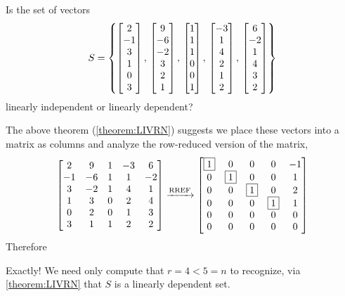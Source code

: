 \documentclass{ximera}
\begin{document}
\begin{example}%
  Is the set of vectors
  \[
    S=\left\{
      \begin{bmatrix}2\\-1\\3\\1\\0\\3\end{bmatrix},\,
      \begin{bmatrix}9\\-6\\-2\\3\\2\\1\end{bmatrix},\,
      \begin{bmatrix}1\\1\\1\\0\\0\\1\end{bmatrix},\,
      \begin{bmatrix}-3\\1\\4\\2\\1\\2\end{bmatrix},\,
      \begin{bmatrix}6\\-2\\1\\4\\3\\2\end{bmatrix}
    \right\}
  \]
  linearly independent or linearly dependent?

  The above theorem (\ref{theorem:LIVRN}) suggests we place these
  vectors into a matrix as columns and analyze the row-reduced version
  of the matrix,
  \[
    \begin{bmatrix}
      2 & 9 & 1 & -3 & 6\\
      -1 & -6 & 1 & 1 & -2\\
      3 & -2 & 1 & 4 & 1\\
      1 & 3 & 0 & 2 & 4\\
      0 & 2 & 0 & 1 & 3\\
      3 & 1 & 1 & 2 & 2
    \end{bmatrix}
    \xrightarrow{\text{RREF}}
    \begin{bmatrix}
      \fbox{1} & 0 & 0 & 0 & -1\\
      0 & \fbox{1} & 0 & 0 & 1\\
      0 & 0 & \fbox{1} & 0 & 2\\
      0 & 0 & 0 & \fbox{1} & 1\\
      0 & 0 & 0 & 0 & 0\\
      0 & 0 & 0 & 0 & 0
    \end{bmatrix}
  \]
  Therefore
  \begin{multipleChoice}
  \end{multipleChoice}

  \begin{feedback}[correct]
    Exactly!  We need only compute that $r=4<5=n$ to recognize, via
    \ref{theorem:LIVRN} that $S$ is a linearly dependent set.
  \end{feedback}

\end{example}
\end{document}
